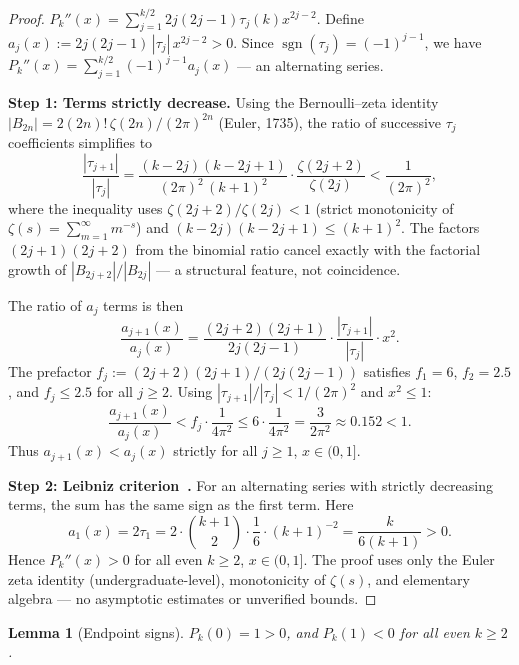 \documentclass[12pt,a4paper]{article}
\theoremstyle{plain}
\newtheorem{lemma}[theorem]{Lemma}
\theoremstyle{definition}
\begin{document}
\begin{proof}
  $P_k''(x) = \sum_{j=1}^{k/2} 2j(2j-1)\tau_j(k) x^{2j-2}$.
  Define $a_j(x) := 2j(2j-1)\,|\tau_j|\,x^{2j-2} > 0$.
  Since $\operatorname{sgn}(\tau_j) = (-1)^{j-1}$, we have
  $P_k''(x) = \sum_{j=1}^{k/2} (-1)^{j-1} a_j(x)$ --- an alternating series.

  \textbf{Step 1: Terms strictly decrease.}
  Using the Bernoulli--zeta identity~\cite{Euler}
  $|B_{2n}| = 2(2n)!\,\zeta(2n)/(2\pi)^{2n}$ (Euler, 1735),
  the ratio of successive $\tau_j$ coefficients simplifies to
  \[
    \frac{|\tau_{j+1}|}{|\tau_j|}
    = \frac{(k-2j)(k-2j+1)}{(2\pi)^2\,(k+1)^2}
      \cdot \frac{\zeta(2j+2)}{\zeta(2j)}
    < \frac{1}{(2\pi)^2},
  \]
  where the inequality uses $\zeta(2j+2)/\zeta(2j) < 1$ (strict
  monotonicity of $\zeta(s)=\sum_{m=1}^{\infty}m^{-s}$) and
  $(k-2j)(k-2j+1) \le (k+1)^2$.  The factors $(2j+1)(2j+2)$ from
  the binomial ratio cancel exactly with the factorial growth of
  $|B_{2j+2}|/|B_{2j}|$ --- a structural feature, not coincidence.

  The ratio of $a_j$ terms is then
  \[
    \frac{a_{j+1}(x)}{a_j(x)}
    = \frac{(2j+2)(2j+1)}{2j(2j-1)}
      \cdot \frac{|\tau_{j+1}|}{|\tau_j|}
      \cdot x^2.
  \]
  The prefactor $f_j := (2j+2)(2j+1)/(2j(2j-1))$ satisfies
  $f_1 = 6$, $f_2 = 2.5$, and $f_j \le 2.5$ for all $j \ge 2$.
  Using $|\tau_{j+1}|/|\tau_j| < 1/(2\pi)^2$ and $x^2 \le 1$:
  \[
    \frac{a_{j+1}(x)}{a_j(x)}
    < f_j \cdot \frac{1}{4\pi^2}
    \le 6 \cdot \frac{1}{4\pi^2}
    = \frac{3}{2\pi^2} \approx 0.152 < 1.
  \]
  Thus $a_{j+1}(x) < a_j(x)$ strictly for all $j \ge 1$, $x \in (0,1]$.

  \textbf{Step 2: Leibniz criterion~\cite{Leibniz}.}
  For an alternating series with strictly decreasing terms, the sum
  has the same sign as the first term.  Here
  \[
    a_1(x) = 2\tau_1 = 2 \cdot \binom{k+1}{2} \cdot \frac{1}{6}
      \cdot (k+1)^{-2}
    = \frac{k}{6(k+1)} > 0.
  \]
  Hence $P_k''(x) > 0$ for all even $k \ge 2$, $x \in (0,1]$.
  The proof uses only the Euler zeta identity (undergraduate-level),
  monotonicity of $\zeta(s)$, and elementary algebra --- no
  asymptotic estimates or unverified bounds.
\end{proof}

\begin{lemma}[Endpoint signs]\label{lem:pk-endpoints}
  $P_k(0) = 1 > 0$, and $P_k(1) < 0$ for all even $k \ge 2$.
\end{lemma}
\end{document}
